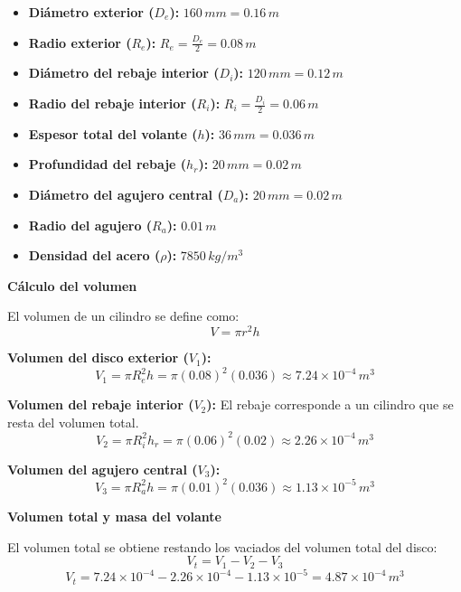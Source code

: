 \documentclass[12pt,letterpaper]{report}
\begin{document}
\begin{itemize}
    \item \textbf{Diámetro exterior ($D_e$):} $160 \, mm = 0.16 \, m$
    \item \textbf{Radio exterior ($R_e$):} $R_e = \frac{D_e}{2} = 0.08 \, m$
    \item \textbf{Diámetro del rebaje interior ($D_i$):} $120 \, mm = 0.12 \, m$
    \item \textbf{Radio del rebaje interior ($R_i$):} $R_i = \frac{D_i}{2} = 0.06 \, m$
    \item \textbf{Espesor total del volante ($h$):} $36 \, mm = 0.036 \, m$
    \item \textbf{Profundidad del rebaje ($h_r$):} $20 \, mm = 0.02 \, m$
    \item \textbf{Diámetro del agujero central ($D_a$):} $20 \, mm = 0.02 \, m$
    \item \textbf{Radio del agujero ($R_a$):} $0.01 \, m$
    \item \textbf{Densidad del acero ($\rho$):} $7850 \, kg/m^3$
\end{itemize}

\textbf{Cálculo del volumen}

El volumen de un cilindro se define como:
\begin{equation}
    V = \pi r^2 h
\end{equation}

\textbf{Volumen del disco exterior ($V_1$):}
\begin{equation}
    V_1 = \pi R_e^2 h = \pi (0.08)^2 (0.036) \approx 7.24 \times 10^{-4} \, m^3
\end{equation}

\textbf{Volumen del rebaje interior ($V_2$):}
El rebaje corresponde a un cilindro que se resta del volumen total.
\begin{equation}
    V_2 = \pi R_i^2 h_r = \pi (0.06)^2 (0.02) \approx 2.26 \times 10^{-4} \, m^3
\end{equation}

\textbf{Volumen del agujero central ($V_3$):}
\begin{equation}
    V_3 = \pi R_a^2 h = \pi (0.01)^2 (0.036) \approx 1.13 \times 10^{-5} \, m^3
\end{equation}

\textbf{Volumen total y masa del volante}

El volumen total se obtiene restando los vaciados del volumen total del disco:
\begin{equation}
    V_t = V_1 - V_2 - V_3
\end{equation}
\begin{equation}
    V_t = 7.24\times10^{-4} - 2.26\times10^{-4} - 1.13\times10^{-5} = 4.87 \times 10^{-4} \, m^3
\end{equation}
\end{document}

